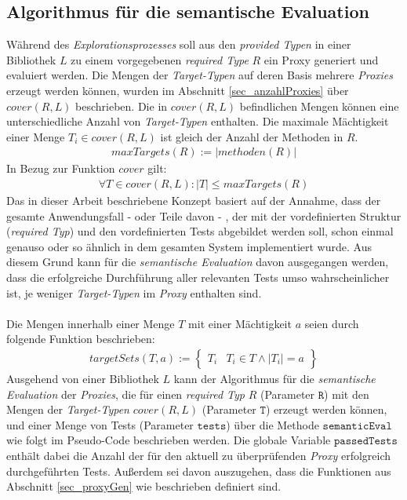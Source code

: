 \subsection{Algorithmus für die semantische Evaluation}\label{sec_semEvalAlgo}
Während des \emph{Explorationsprozesses} soll aus den \emph{provided Typen} in einer Bibliothek $L$ zu einem vorgegebenen \emph{required Type} $R$ ein Proxy generiert und evaluiert werden. Die Mengen der \emph{Target-Typen} auf deren Basis mehrere \emph{Proxies} erzeugt werden können, wurden im Abschnitt \ref{sec_anzahlProxies} über $\mathit{cover(R,L)}$ beschrieben. Die in $\mathit{cover(R,L)}$ befindlichen Mengen können eine unterschiedliche Anzahl von \emph{Target-Typen} enthalten. Die maximale Mächtigkeit einer Menge $T_i \in \mathit{cover(R,L)}$ ist gleich der Anzahl der Methoden in $R$.
\begin{gather*}
\mathit{maxTargets(R)} := |\mathit{methoden(R)}|
\end{gather*}
\noindent
In Bezug zur Funktion $\mathit{cover}$ gilt:
\begin{gather*}
\forall T \in \mathit{cover(R,L)} : |T| \leq \mathit{maxTargets(R)}
\end{gather*}
\noindent
Das in dieser Arbeit beschriebene Konzept basiert auf der Annahme, dass der gesamte Anwendungsfall - oder Teile davon - , der mit der vordefinierten Struktur (\emph{required Typ}) und den vordefinierten Tests abgebildet werden soll, schon einmal genauso oder so ähnlich in dem gesamten System implementiert wurde. Aus diesem Grund kann für die \emph{semantische Evaluation} davon ausgegangen werden, dass die erfolgreiche Durchführung aller relevanten Tests umso wahrscheinlicher ist, je weniger \emph{Target-Typen} im \emph{Proxy} enthalten sind.
\\\\
Die Mengen innerhalb einer Menge $T$ mit einer Mächtigkeit $a$ seien durch folgende Funktion beschrieben:
\begin{gather*}
\mathit{targetSets(T,a)} := 
\left\{\begin{array}{l|l}	
				T_i & T_i \in T \wedge |T_i| = a
		 \end{array}
\right\}
\end{gather*}
\noindent
Ausgehend von einer Bibliothek $L$ kann der Algorithmus für die \emph{semantische Evaluation} der \emph{Proxies}, die für einen \emph{required Typ} $R$ (Parameter $\texttt{R}$) mit den Mengen der \emph{Target-Typen} $\mathit{cover(R, L)}$ (Parameter $\texttt{T}$) erzeugt werden können, und einer Menge von Tests (Parameter $\texttt{tests}$) über die Methode $\texttt{semanticEval}$ wie folgt im Pseudo-Code beschrieben werden. Die globale Variable $\texttt{passedTests}$ enthält dabei die Anzahl der für den aktuell zu überprüfenden \emph{Proxy} erfolgreich durchgeführten Tests. Außerdem sei davon auszugehen, dass die Funktionen aus Abschnitt \ref{sec_proxyGen} wie beschrieben definiert sind.

